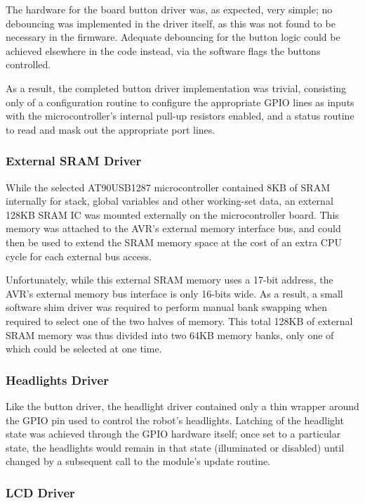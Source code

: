 The hardware for the board button driver was, as expected, very simple; no debouncing was implemented in the driver itself, as this was not found to be necessary in the firmware. Adequate debouncing for the button logic could be achieved elsewhere in the code instead, via the software flags the buttons controlled.

As a result, the completed button driver implementation was trivial, consisting only of a configuration routine to configure the appropriate GPIO lines as inputs with the microcontroller's internal pull-up resistors enabled, and a status routine to read and mask out the appropriate port lines.

\FloatBarrier
\subsubsection{External SRAM Driver}

While the selected AT90USB1287 microcontroller contained 8KB of SRAM internally for stack, global variables and other working-set data, an external 128KB SRAM IC was mounted externally on the microcontroller board. This memory was attached to the AVR's external memory interface bus, and could then be used to extend the SRAM memory space at the cost of an extra CPU cycle for each external bus access.

Unfortunately, while this external SRAM memory uses a 17-bit address, the AVR's external memory bus interface is only 16-bits wide. As a result, a small software shim driver was required to perform manual bank swapping when required to select one of the two halves of memory. This total 128KB of external SRAM memory was thus divided into two 64KB memory banks, only one of which could be selected at one time.

\FloatBarrier
\subsubsection{Headlights Driver}

Like the button driver, the headlight driver contained only a thin wrapper around the GPIO pin used to control the robot's headlights. Latching of the headlight state was achieved through the GPIO hardware itself; once set to a particular state, the headlights would remain in that state (illuminated or disabled) until changed by a subsequent call to the module's update routine.

\FloatBarrier
\subsubsection{LCD Driver}

